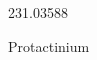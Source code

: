 \documentclass[12pt]{article}
\begin{document}
\hfill{}
\vfill
\begin{center}
  {\fontsize{50}{60}
  }

  231.03588

Protactinium
\end{center}
\vfill
\end{document}
